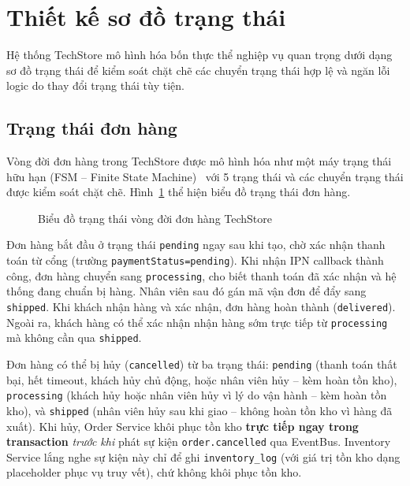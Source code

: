 \section{Thiết kế sơ đồ trạng thái}
\label{sec:c3_state_diagrams}

Hệ thống TechStore mô hình hóa bốn thực thể nghiệp vụ quan trọng dưới dạng sơ đồ trạng thái để kiểm soát chặt chẽ các chuyển trạng thái hợp lệ và ngăn lỗi logic do thay đổi trạng thái tùy tiện.

\subsection{Trạng thái đơn hàng}
\label{sec:c3_order_states}

Vòng đời đơn hàng trong TechStore được mô hình hóa như một máy trạng thái hữu hạn (FSM -- Finite State Machine)~\cite{fowler2003patterns} với 5 trạng thái và các chuyển trạng thái được kiểm soát chặt chẽ. Hình~\ref{fig:order_states} thể hiện biểu đồ trạng thái đơn hàng.

\clearpage
\begin{figure}[H]
  \centering
  \caption{Biểu đồ trạng thái vòng đời đơn hàng TechStore}
  \label{fig:order_states}
\end{figure}

Đơn hàng bắt đầu ở trạng thái \texttt{pending} ngay sau khi tạo, chờ xác nhận thanh toán từ cổng (trường \texttt{paymentStatus=pending}). Khi nhận IPN callback thành công, đơn hàng chuyển sang \texttt{processing}, cho biết thanh toán đã xác nhận và hệ thống đang chuẩn bị hàng. Nhân viên sau đó gán mã vận đơn để đẩy sang \texttt{shipped}. Khi khách nhận hàng và xác nhận, đơn hàng hoàn thành (\texttt{delivered}). Ngoài ra, khách hàng có thể xác nhận nhận hàng sớm trực tiếp từ \texttt{processing} mà không cần qua \texttt{shipped}.

Đơn hàng có thể bị hủy (\texttt{cancelled}) từ ba trạng thái: \texttt{pending} (thanh toán thất bại, hết timeout, khách hủy chủ động, hoặc nhân viên hủy -- kèm hoàn tồn kho), \texttt{processing} (khách hủy hoặc nhân viên hủy vì lý do vận hành -- kèm hoàn tồn kho), và \texttt{shipped} (nhân viên hủy sau khi giao -- không hoàn tồn kho vì hàng đã xuất). Khi hủy, Order Service khôi phục tồn kho \textbf{trực tiếp ngay trong transaction} \textit{trước khi} phát sự kiện \texttt{order.cancelled} qua EventBus. Inventory Service lắng nghe sự kiện này chỉ để ghi \texttt{inventory\_log} (với giá trị tồn kho dạng placeholder phục vụ truy vết), chứ không khôi phục tồn kho.

